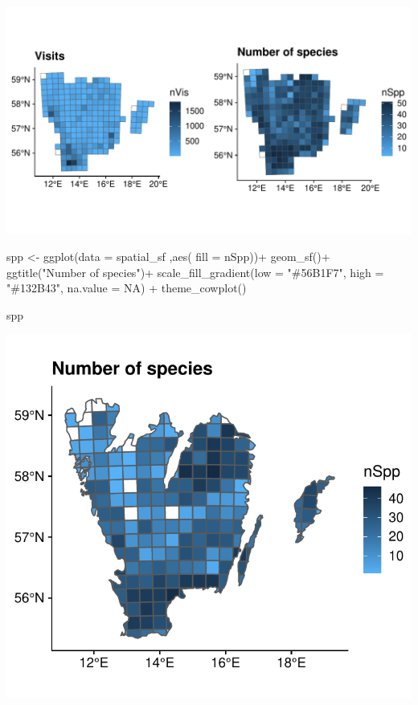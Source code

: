 \documentclass[
  10pt,
]{article}
\newenvironment{Shaded}{\begin{snugshade}}{\end{snugshade}}
\newcommand{\AttributeTok}[1]{\textcolor[rgb]{0.77,0.63,0.00}{#1}}
\newcommand{\ConstantTok}[1]{\textcolor[rgb]{0.00,0.00,0.00}{#1}}
\newcommand{\FunctionTok}[1]{\textcolor[rgb]{0.00,0.00,0.00}{#1}}
\newcommand{\NormalTok}[1]{#1}
\newcommand{\OtherTok}[1]{\textcolor[rgb]{0.56,0.35,0.01}{#1}}
\newcommand{\SpecialCharTok}[1]{\textcolor[rgb]{0.00,0.00,0.00}{#1}}
\newcommand{\StringTok}[1]{\textcolor[rgb]{0.31,0.60,0.02}{#1}}
\begin{document}
\includegraphics{r-tools-tutorial_files/figure-latex/ggplot1-1.pdf}

\begin{Shaded}
\begin{Highlighting}[]
\NormalTok{spp }\OtherTok{\textless{}{-}} \FunctionTok{ggplot}\NormalTok{(}\AttributeTok{data =}\NormalTok{ spatial\_sf ,}\FunctionTok{aes}\NormalTok{( }\AttributeTok{fill =}\NormalTok{ nSpp))}\SpecialCharTok{+}
  \FunctionTok{geom\_sf}\NormalTok{()}\SpecialCharTok{+}
  \FunctionTok{ggtitle}\NormalTok{(}\StringTok{"Number of species"}\NormalTok{)}\SpecialCharTok{+}
  \FunctionTok{scale\_fill\_gradient}\NormalTok{(}\AttributeTok{low =} \StringTok{"\#56B1F7"}\NormalTok{,}
                      \AttributeTok{high =} \StringTok{"\#132B43"}\NormalTok{,}
                      \AttributeTok{na.value =} \ConstantTok{NA}\NormalTok{) }\SpecialCharTok{+}
  \FunctionTok{theme\_cowplot}\NormalTok{()}

\NormalTok{spp}
\end{Highlighting}
\end{Shaded}

\includegraphics{r-tools-tutorial_files/figure-latex/ggplot2-1.pdf}
\end{document}
